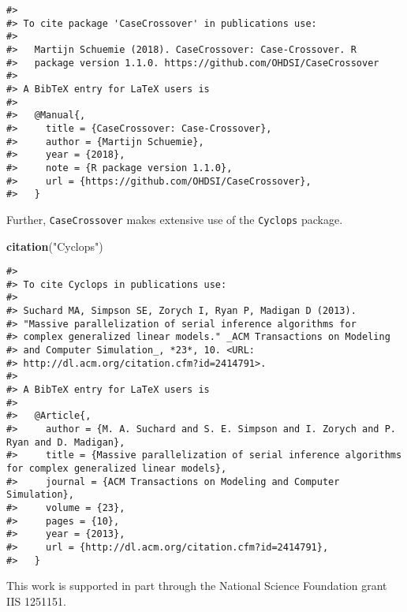 \documentclass[]{article}
\newenvironment{Shaded}{\begin{snugshade}}{\end{snugshade}}
\newcommand{\KeywordTok}[1]{\textcolor[rgb]{0.13,0.29,0.53}{\textbf{#1}}}
\newcommand{\NormalTok}[1]{#1}
\newcommand{\StringTok}[1]{\textcolor[rgb]{0.31,0.60,0.02}{#1}}
\begin{document}
\begin{verbatim}
#> 
#> To cite package 'CaseCrossover' in publications use:
#> 
#>   Martijn Schuemie (2018). CaseCrossover: Case-Crossover. R
#>   package version 1.1.0. https://github.com/OHDSI/CaseCrossover
#> 
#> A BibTeX entry for LaTeX users is
#> 
#>   @Manual{,
#>     title = {CaseCrossover: Case-Crossover},
#>     author = {Martijn Schuemie},
#>     year = {2018},
#>     note = {R package version 1.1.0},
#>     url = {https://github.com/OHDSI/CaseCrossover},
#>   }
\end{verbatim}

Further, \texttt{CaseCrossover} makes extensive use of the
\texttt{Cyclops} package.

\begin{Shaded}
\begin{Highlighting}[]
\KeywordTok{citation}\NormalTok{(}\StringTok{"Cyclops"}\NormalTok{)}
\end{Highlighting}
\end{Shaded}

\begin{verbatim}
#> 
#> To cite Cyclops in publications use:
#> 
#> Suchard MA, Simpson SE, Zorych I, Ryan P, Madigan D (2013).
#> "Massive parallelization of serial inference algorithms for
#> complex generalized linear models." _ACM Transactions on Modeling
#> and Computer Simulation_, *23*, 10. <URL:
#> http://dl.acm.org/citation.cfm?id=2414791>.
#> 
#> A BibTeX entry for LaTeX users is
#> 
#>   @Article{,
#>     author = {M. A. Suchard and S. E. Simpson and I. Zorych and P. Ryan and D. Madigan},
#>     title = {Massive parallelization of serial inference algorithms for complex generalized linear models},
#>     journal = {ACM Transactions on Modeling and Computer Simulation},
#>     volume = {23},
#>     pages = {10},
#>     year = {2013},
#>     url = {http://dl.acm.org/citation.cfm?id=2414791},
#>   }
\end{verbatim}

This work is supported in part through the National Science Foundation
grant IIS 1251151.
\end{document}
